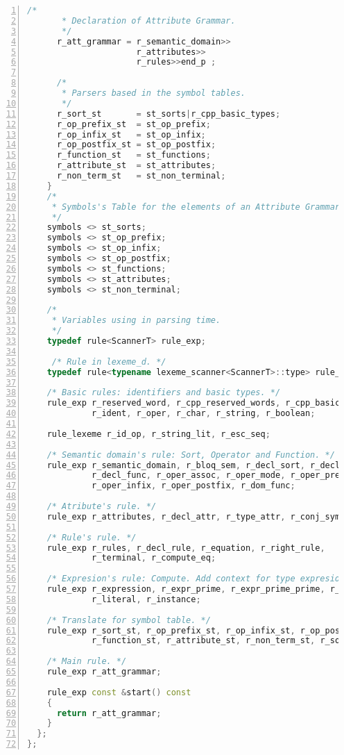 \begin{center}
\begin{lstlisting}[numbers=left,basicstyle=\tiny,language=C++]
      /*
       * Declaration of Attribute Grammar.
       */
      r_att_grammar = r_semantic_domain>>
                      r_attributes>>
                      r_rules>>end_p ;

      /*
       * Parsers based in the symbol tables.
       */
      r_sort_st       = st_sorts|r_cpp_basic_types;
      r_op_prefix_st  = st_op_prefix;
      r_op_infix_st   = st_op_infix;
      r_op_postfix_st = st_op_postfix;
      r_function_st   = st_functions;
      r_attribute_st  = st_attributes;
      r_non_term_st   = st_non_terminal;
    }
    /*
     * Symbols's Table for the elements of an Attribute Grammar.
     */
    symbols <> st_sorts;
    symbols <> st_op_prefix;
    symbols <> st_op_infix;
    symbols <> st_op_postfix;
    symbols <> st_functions;
    symbols <> st_attributes;
    symbols <> st_non_terminal;

    /*
     * Variables using in parsing time.
     */
    typedef rule<ScannerT> rule_exp;

     /* Rule in lexeme_d. */
    typedef rule<typename lexeme_scanner<ScannerT>::type> rule_lexeme;

    /* Basic rules: identifiers and basic types. */
    rule_exp r_reserved_word, r_cpp_reserved_words, r_cpp_basic_types,
             r_ident, r_oper, r_char, r_string, r_boolean;

    rule_lexeme r_id_op, r_string_lit, r_esc_seq;

    /* Semantic domain's rule: Sort, Operator and Function. */
    rule_exp r_semantic_domain, r_bloq_sem, r_decl_sort, r_decl_oper,
             r_decl_func, r_oper_assoc, r_oper_mode, r_oper_prefix,
             r_oper_infix, r_oper_postfix, r_dom_func;

    /* Atribute's rule. */
    rule_exp r_attributes, r_decl_attr, r_type_attr, r_conj_symb;

    /* Rule's rule. */
    rule_exp r_rules, r_decl_rule, r_equation, r_right_rule,
             r_terminal, r_compute_eq;

    /* Expresion's rule: Compute. Add context for type expresion. */
    rule_exp r_expression, r_expr_prime, r_expr_prime_prime, r_function,
             r_literal, r_instance;

    /* Translate for symbol table. */
    rule_exp r_sort_st, r_op_prefix_st, r_op_infix_st, r_op_postfix_st,
             r_function_st, r_attribute_st, r_non_term_st, r_sort_stable;

    /* Main rule. */
    rule_exp r_att_grammar;

    rule_exp const &start() const
    {
      return r_att_grammar;
    }
  };
};
\end{lstlisting}\end{center}
